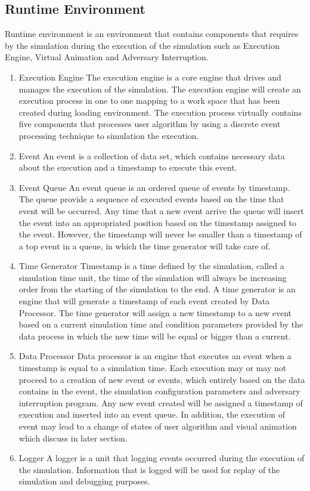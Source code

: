 \subsection{Runtime Environment}

Runtime environment is an environment that contains components that requires by the simulation during the execution of the simulation such as Execution Engine, Virtual Animation and Adversary Interruption.

\begin{enumerate}
\item{Execution Engine}
The execution engine is a core engine that drives and manages the execution of the simulation. The execution engine will create an execution process in one to one mapping to a work space that has been created during loading environment. The execution process virtually contains five components that processes user algorithm by using a discrete event processing technique to simulation the execution.

\item{Event}
An event is a collection of data set, which contains necessary data about the execution and a timestamp to execute this event.

\item{Event Queue}
An event queue is an ordered queue of events by timestamp. The queue provide a sequence of executed events based on the time that event will be occurred. Any time that a new event arrive the queue will insert the event into an appropriated position based on the timestamp assigned to the event. However, the timestamp will never be smaller than a timestamp of a top event in a queue, in which the time generator will take care of.

\item{Time Generator}
Timestamp is a time defined by the simulation, called a simulation time unit, the time of the simulation will always be increasing order from the starting of the simulation to the end. A time generator is an engine that will generate a timestamp of each event created by Data Processor. The time generator will assign a new timestamp to a new event based on a current simulation time and condition parameters provided by the data process in which the new time will be equal or bigger than a current.

\item{Data Processor}
Data processor is an engine that executes an event when a timestamp is equal to a simulation time. Each execution may or may not proceed to a creation of new event or events, which entirely based on the data contains in the event, the simulation configuration parameters and adversary interruption program. Any new event created will be assigned a timestamp of execution and inserted into an event queue. In addition, the execution of event may lead to a change of states of user algorithm and visual animation which discuss in later section.

\item{Logger}
A logger is a unit that logging events occurred during the execution of the simulation. Information that is logged will be used for replay of the simulation and debugging purposes.
\end{enumerate}


